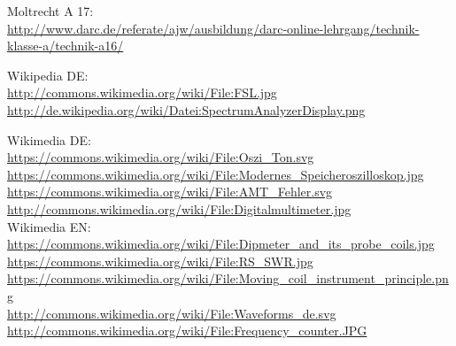 	\begin{small}
    \begin{thebibliography}{}
      Moltrecht A 17: \\
                    \url{http://www.darc.de/referate/ajw/ausbildung/darc-online-lehrgang/technik-klasse-a/technik-a16/}
                    
        Wikipedia DE: \\
    	\url{http://commons.wikimedia.org/wiki/File:FSL.jpg}\\
    	\url{http://de.wikipedia.org/wiki/Datei:SpectrumAnalyzerDisplay.png}
                    
    	Wikimedia DE:\\
   		\url{https://commons.wikimedia.org/wiki/File:Oszi_Ton.svg}\\
   		\url{https://commons.wikimedia.org/wiki/File:Modernes_Speicheroszilloskop.jpg}\\
   		\url{https://commons.wikimedia.org/wiki/File:AMT_Fehler.svg}\\
   		\url{http://commons.wikimedia.org/wiki/File:Digitalmultimeter.jpg}\\
   		
   		Wikimedia EN:\\
   		\url{https://commons.wikimedia.org/wiki/File:Dipmeter_and_its_probe_coils.jpg}\\
   		\url{https://commons.wikimedia.org/wiki/File:RS_SWR.jpg}\\
   		\url{https://commons.wikimedia.org/wiki/File:Moving_coil_instrument_principle.png}\\
   		\url{http://commons.wikimedia.org/wiki/File:Waveforms_de.svg}
   		\url{http://commons.wikimedia.org/wiki/File:Frequency_counter.JPG}\\
   		  		
	\end{thebibliography}
	\end{small}


